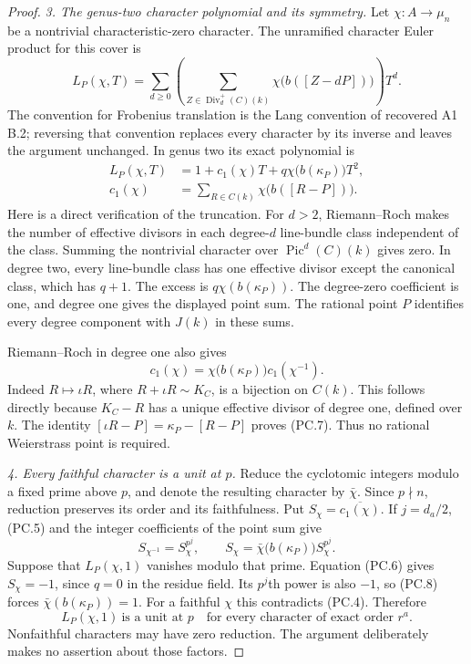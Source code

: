 \begin{proof}
\emph{3. The genus-two character polynomial and its symmetry.}
Let $\chi:A\to\mu_n$ be a nontrivial characteristic-zero
character. The unramified character Euler product for this cover is
\[
 L_P(\chi,T)
 =\sum_{d\ge0}\left(
   \sum_{Z\in\operatorname{Div}^{+}_d(C)(k)}
      \chi\bigl(b([Z-dP])\bigr)\right)T^d.
\]
The convention for Frobenius translation is the Lang convention
of recovered A1 B.2; reversing that convention replaces every
character by its inverse and leaves the argument unchanged.
In genus two its exact polynomial is
\[
 \begin{aligned}
 L_P(\chi,T)&=1+c_1(\chi)T
                  +q\chi\bigl(b(\kappa_P)\bigr)T^2,\\
 c_1(\chi)&=\sum_{R\in C(k)}\chi\bigl(b([R-P])\bigr).
 \end{aligned}
 \tag{PC.6}
\]
Here is a direct verification of the truncation. For $d>2$,
Riemann--Roch makes the number of effective divisors in each
degree-$d$ line-bundle class independent of the class. Summing
the nontrivial character over $\operatorname{Pic}^d(C)(k)$ gives
zero. In degree two, every line-bundle class has one effective
divisor except the canonical class, which has $q+1$. The excess
is $q\chi(b(\kappa_P))$. The degree-zero coefficient is one,
and degree one gives the displayed point sum. The rational point
$P$ identifies every degree component with $J(k)$ in these sums.

Riemann--Roch in degree one also gives
\[
 c_1(\chi)=\chi\bigl(b(\kappa_P)\bigr)c_1(\chi^{-1}).
 \tag{PC.7}
\]
Indeed $R\mapsto\iota R$, where $R+\iota R\sim K_C$, is a
bijection on $C(k)$. This follows directly because $K_C-R$ has
a unique effective divisor of degree one, defined over $k$.
The identity
$[\iota R-P]=\kappa_P-[R-P]$ proves (PC.7).
Thus no rational Weierstrass point is required.

\emph{4. Every faithful character is a unit at $p$.}
Reduce the cyclotomic integers modulo a fixed prime above $p$,
and denote the resulting character by $\bar\chi$. Since
$p\nmid n$, reduction preserves its order and its faithfulness.
Put $S_\chi=\overline{c_1(\chi)}$. If $j=d_a/2$, (PC.5)
and the integer coefficients of the point sum give
\[
 S_{\chi^{-1}}=S_\chi^{p^j},\qquad
 S_\chi=\bar\chi\bigl(b(\kappa_P)\bigr)S_\chi^{p^j}.
 \tag{PC.8}
\]
Suppose that $L_P(\chi,1)$ vanishes modulo that prime.
Equation (PC.6) gives $S_\chi=-1$, since $q=0$ in the residue
field. Its $p^j$th power is also $-1$, so (PC.8) forces
$\bar\chi(b(\kappa_P))=1$.
For a faithful $\chi$ this contradicts (PC.4). Therefore
\[
 L_P(\chi,1)\ \text{is a unit at }p
       \quad\text{for every character of exact order }r^a.
 \tag{PC.9}
\]
Nonfaithful characters may have zero reduction. The argument
deliberately makes no assertion about those factors.


\end{proof}
